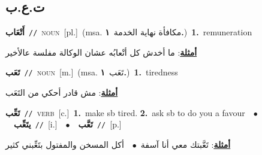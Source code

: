 \documentclass[10pt,a4paper,twoside]{article} %
\begin{document}
\begin{multicols}{2}
{{{{{{{{{{{\vspace{-3mm}
\subsection*{\color{blue}\foreignlanguage{arabic}{ت.ع.ب}\color{blue}{}} 

{\setlength\topsep{0pt}\textbf{\foreignlanguage{arabic}{أَتْعَاب}}\ {\color{gray}\texttt{//}\color{black}}\ \textsc{noun}\ [pl.]\ \color{gray}(msa. \foreignlanguage{arabic}{مكافأة نهاية الخدمة}~\foreignlanguage{arabic}{\textbf{١.}})\color{black}\ \textbf{1.}~remuneration\  \begin{flushright}\color{gray}\foreignlanguage{arabic}{\textbf{\underline{\foreignlanguage{arabic}{أمثلة}}}: ما أخدش كل أتْعابُه عشان الوكالة مفلسة عالأخير}\end{flushright}\color{black}} \vspace{2mm}

{\setlength\topsep{0pt}\textbf{\foreignlanguage{arabic}{تَعَب}}\ {\color{gray}\texttt{//}\color{black}}\ \textsc{noun}\ [m.]\ \color{gray}(msa. \foreignlanguage{arabic}{تَعَب}~\foreignlanguage{arabic}{\textbf{١.}})\color{black}\ \textbf{1.}~tiredness\  \begin{flushright}\color{gray}\foreignlanguage{arabic}{\textbf{\underline{\foreignlanguage{arabic}{أمثلة}}}: مش قادر أحكي من التَعَب}\end{flushright}\color{black}} \vspace{2mm}

{\setlength\topsep{0pt}\textbf{\foreignlanguage{arabic}{تَعِّب}}\ {\color{gray}\texttt{//}\color{black}}\ \textsc{verb}\ [c.]\ \textbf{1.}~make sb tired.  \textbf{2.}~ask sb to do you a favour\ \ $\bullet$\ \ \setlength\topsep{0pt}\textbf{\foreignlanguage{arabic}{يتَعِّب}}\ {\color{gray}\texttt{//}\color{black}}\ [i.]\ \ $\bullet$\ \ \setlength\topsep{0pt}\textbf{\foreignlanguage{arabic}{تَعَّب}}\ {\color{gray}\texttt{//}\color{black}}\ [p.]\  \begin{flushright}\color{gray}\foreignlanguage{arabic}{\textbf{\underline{\foreignlanguage{arabic}{أمثلة}}}: تَعَّبتك معي أنا آسفة\ $\bullet$\ \  أكل المسخن والمفتول بتَعِّبني كثير}\end{flushright}\color{black}} \vspace{2mm}

}}}}}}}}}}}
\end{multicols}
\end{document}
